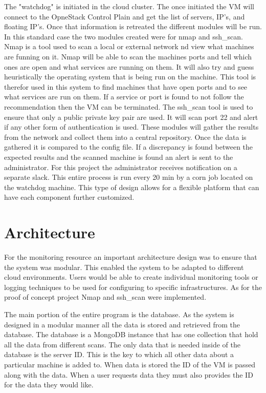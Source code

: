 \documentclass[12pt]{article}
\begin{document}
The "watchdog" is initiated in the cloud cluster. The once initiated the VM will connect to the OpneStack Control Plain and get the list of servers, IP's, and floating IP's. Once that information is retreated the different modules will be run. In this standard case the two modules created were for nmap and ssh\_scan. Nmap is a tool used to scan a local or external network nd view what machines are funning on it. Nmap will be able to scan the machines ports and tell which ones are open and what services are running on them. It will also try and guess heuristically the operating system that is being run on the machine. This tool is therefor used in this system to find machines that have open ports and to see what services are run on them. If a service or port is found to not follow the recommendation then the VM can be terminated. The ssh\_scan tool is used to ensure that only a public private key pair are used. It will scan port 22 and alert if any other form of authentication is used.
These modules will gather the results from the network and collect them into a central repository. Once the data is gathered it is compared to the config file.  If a discrepancy is found between the expected results and the scanned machine is found an alert is sent to the administrator. For this project the administrator receives notification on a separate slack. This entire process is run every 20 min by a corn job located on the watchdog machine. This type of design allows for a flexible platform that can have each component further customized.

\section{Architecture}
For the monitoring resource an important architecture design was to ensure that the system was modular.  This enabled the system to be adapted to different cloud environments. Users would be able to create individual monitoring tools or logging techniques to be used for configuring to specific infrastructures. As for the proof of concept project Nmap and ssh\_scan were implemented.

The main portion of the entire program is the database. As the system is designed in a modular manner all the data is stored and retrieved from the database. The database is a MongoDB instance that has one collection that hold all the data from different scans. The only data that is needed inside of the database is the server ID\@. This is the key to which all other data about a particular machine is added to. When data is stored the ID of the VM is passed along with the data. When a user requests data they must also provides the ID for the data they would like.
\end{document}
